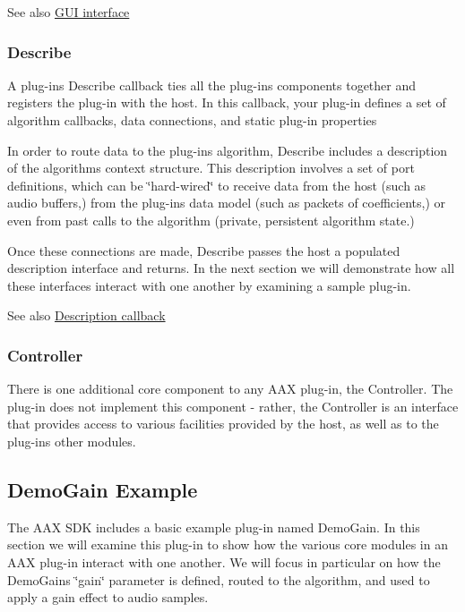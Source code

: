  \begin{DoxySeeAlso}{See also}
\hyperlink{a00329}{G\+U\+I interface}
\end{DoxySeeAlso}
\hypertarget{a00324_subsection__describe}{}\subsubsection{Describe}\label{a00324_subsection__describe}
A plug-\/in\textquotesingle{}s Describe callback ties all the plug-\/in\textquotesingle{}s components together and registers the plug-\/in with the host. In this callback, your plug-\/in defines a set of algorithm callbacks, data connections, and static plug-\/in properties

In order to route data to the plug-\/in\textquotesingle{}s algorithm, Describe includes a description of the algorithm\textquotesingle{}s context structure. This description involves a set of port definitions, which can be \char`\"{}hard-\/wired\char`\"{} to receive data from the host (such as audio buffers,) from the plug-\/in\textquotesingle{}s data model (such as packets of coefficients,) or even from past calls to the algorithm (private, persistent algorithm state.)

Once these connections are made, Describe passes the host a populated description interface and returns. In the next section we will demonstrate how all these interfaces interact with one another by examining a sample plug-\/in.

\begin{DoxySeeAlso}{See also}
\hyperlink{a00326}{Description callback}
\end{DoxySeeAlso}
\hypertarget{a00324_subsection__controller}{}\subsubsection{Controller}\label{a00324_subsection__controller}
There is one additional core component to any A\+A\+X plug-\/in, the Controller. The plug-\/in does not implement this component -\/ rather, the Controller is an interface that provides access to various facilities provided by the host, as well as to the plug-\/in\textquotesingle{}s other modules. 

 \hypertarget{a00324_aax_sdk_guide_02_demogain_example}{}\subsection{Demo\+Gain Example}\label{a00324_aax_sdk_guide_02_demogain_example}
The A\+A\+X S\+D\+K includes a basic example plug-\/in named Demo\+Gain. In this section we will examine this plug-\/in to show how the various core modules in an A\+A\+X plug-\/in interact with one another. We will focus in particular on how the Demo\+Gain\textquotesingle{}s \char`\"{}gain\char`\"{} parameter is defined, routed to the algorithm, and used to apply a gain effect to audio samples.

